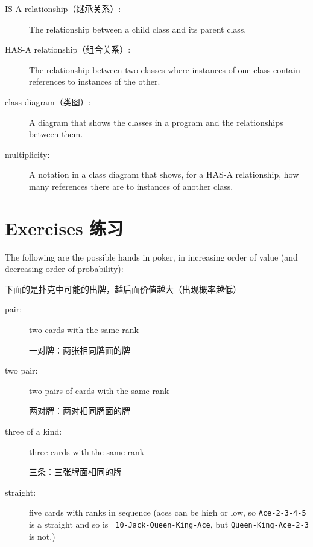 \documentclass[10pt]{book}
\begin{document}
\begin{CJK}{UTF8}{gbsn}
\begin{description}
\item[IS-A relationship（继承关系）:] The relationship between a child class
and its parent class.

\item[HAS-A relationship（组合关系）:] The relationship between two classes
where instances of one class contain references to instances of
the other.

\item[class diagram（类图）:] A diagram that shows the classes in a program
and the relationships between them.

\item[multiplicity:] A notation in a class diagram that shows, for
a HAS-A relationship, how many references there are to instances
of another class.

\end{description}


\section{Exercises 练习}

\begin{exercise}
\label{poker}

The following are the possible hands in poker, in increasing order
of value (and decreasing order of probability):

下面的是扑克中可能的出牌，越后面价值越大（出现概率越低）

\begin{description}

\item[pair:] two cards with the same rank
\vspace{-0.05in}

一对牌：两张相同牌面的牌

\item[two pair:] two pairs of cards with the same rank
\vspace{-0.05in}

两对牌：两对相同牌面的牌

\item[three of a kind:] three cards with the same rank
\vspace{-0.05in}

三条：三张牌面相同的牌

\item[straight:] five cards with ranks in sequence (aces can
be high or low, so {\tt Ace-2-3-4-5} is a straight and so is {\tt
10-Jack-Queen-King-Ace}, but {\tt Queen-King-Ace-2-3} is not.)
\vspace{-0.05in}


\end{description}
\end{exercise}
\end{CJK}
\end{document}
